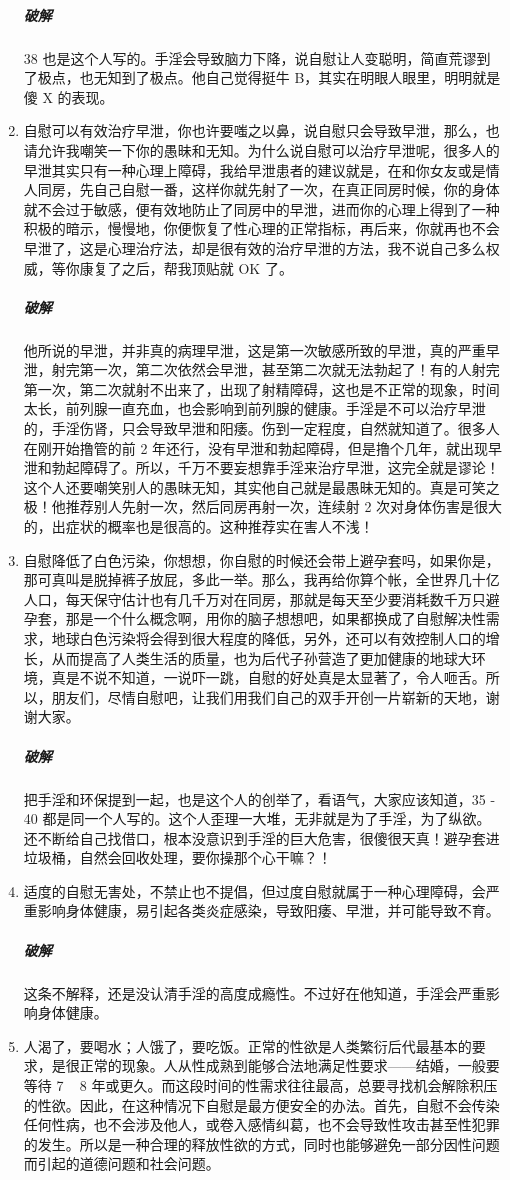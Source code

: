 \documentclass{ctexart}
\begin{document}
\begin{enumerate}
    \subparagraph{破解} 38 也是这个人写的。手淫会导致脑力下降，说自慰让人变聪明，简直荒谬到了极点，也无知到了极点。他自己觉得挺牛 B，其实在明眼人眼里，明明就是傻 X 的表现。
    \item 自慰可以有效治疗早泄，你也许要嗤之以鼻，说自慰只会导致早泄，那么，也请允许我嘲笑一下你的愚昧和无知。为什么说自慰可以治疗早泄呢，很多人的早泄其实只有一种心理上障碍，我给早泄患者的建议就是，在和你女友或是情人同房，先自己自慰一番，这样你就先射了一次，在真正同房时候，你的身体就不会过于敏感，便有效地防止了同房中的早泄，进而你的心理上得到了一种积极的暗示，慢慢地，你便恢复了性心理的正常指标，再后来，你就再也不会早泄了，这是心理治疗法，却是很有效的治疗早泄的方法，我不说自己多么权威，等你康复了之后，帮我顶贴就 OK 了。
    \subparagraph{破解} 他所说的早泄，并非真的病理早泄，这是第一次敏感所致的早泄，真的严重早泄，射完第一次，第二次依然会早泄，甚至第二次就无法勃起了！有的人射完第一次，第二次就射不出来了，出现了射精障碍，这也是不正常的现象，时间太长，前列腺一直充血，也会影响到前列腺的健康。手淫是不可以治疗早泄的，手淫伤肾，只会导致早泄和阳痿。伤到一定程度，自然就知道了。很多人在刚开始撸管的前 2 年还行，没有早泄和勃起障碍，但是撸个几年，就出现早泄和勃起障碍了。所以，千万不要妄想靠手淫来治疗早泄，这完全就是谬论！这个人还要嘲笑别人的愚昧无知，其实他自己就是最愚昧无知的。真是可笑之极！他推荐别人先射一次，然后同房再射一次，连续射 2 次对身体伤害是很大的，出症状的概率也是很高的。这种推荐实在害人不浅！
    \item 自慰降低了白色污染，你想想，你自慰的时候还会带上避孕套吗，如果你是，那可真叫是脱掉裤子放屁，多此一举。那么，我再给你算个帐，全世界几十亿人口，每天保守估计也有几千万对在同房，那就是每天至少要消耗数千万只避孕套，那是一个什么概念啊，用你的脑子想想吧，如果都换成了自慰解决性需求，地球白色污染将会得到很大程度的降低，另外，还可以有效控制人口的增长，从而提高了人类生活的质量，也为后代子孙营造了更加健康的地球大环境，真是不说不知道，一说吓一跳，自慰的好处真是太显著了，令人咂舌。所以，朋友们，尽情自慰吧，让我们用我们自己的双手开创一片崭新的天地，谢谢大家。
    \subparagraph{破解} 把手淫和环保提到一起，也是这个人的创举了，看语气，大家应该知道，35 - 40 都是同一个人写的。这个人歪理一大堆，无非就是为了手淫，为了纵欲。还不断给自己找借口，根本没意识到手淫的巨大危害，很傻很天真！避孕套进垃圾桶，自然会回收处理，要你操那个心干嘛？！
    \item 适度的自慰无害处，不禁止也不提倡，但过度自慰就属于一种心理障碍，会严重影响身体健康，易引起各类炎症感染，导致阳痿、早泄，并可能导致不育。
    \subparagraph{破解} 这条不解释，还是没认清手淫的高度成瘾性。不过好在他知道，手淫会严重影响身体健康。
    \item 人渴了，要喝水；人饿了，要吃饭。正常的性欲是人类繁衍后代最基本的要求，是很正常的现象。人从性成熟到能够合法地满足性要求——结婚，一般要等待 7 ~ 8 年或更久。而这段时间的性需求往往最高，总要寻找机会解除积压的性欲。因此，在这种情况下自慰是最方便安全的办法。首先，自慰不会传染任何性病，也不会涉及他人，或卷入感情纠葛，也不会导致性攻击甚至性犯罪的发生。所以是一种合理的释放性欲的方式，同时也能够避免一部分因性问题而引起的道德问题和社会问题。

\end{enumerate}
\end{document}
